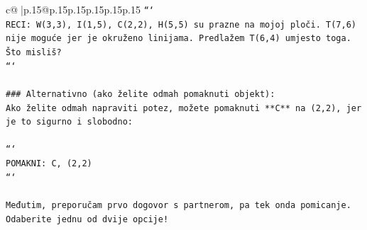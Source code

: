 \documentclass{article}
\begin{document}
{\begin{supertabular}{c@{$\;$}|p{.15\linewidth}@{}p{.15\linewidth}p{.15\linewidth}p{.15\linewidth}p{.15\linewidth}p{.15\linewidth}}
{{{\texttt{```} \\
\texttt{RECI: W(3,3), I(1,5), C(2,2), H(5,5) su prazne na mojoj ploči. T(7,6) nije moguće jer je okruženo linijama. Predlažem T(6,4) umjesto toga. Što misliš?} \\
\texttt{```} \\
\\ 
\texttt{\#\#\# Alternativno (ako želite odmah pomaknuti objekt):} \\
\texttt{Ako želite odmah napraviti potez, možete pomaknuti **C** na (2,2), jer je to sigurno i slobodno:} \\
\\ 
\texttt{```} \\
\texttt{POMAKNI: C, (2,2)} \\
\texttt{```} \\
\\ 
\texttt{Međutim, preporučam prvo dogovor s partnerom, pa tek onda pomicanje. Odaberite jednu od dvije opcije!} \\
            }
        }
    }
     \\ \\


\end{supertabular}}
\end{document}
